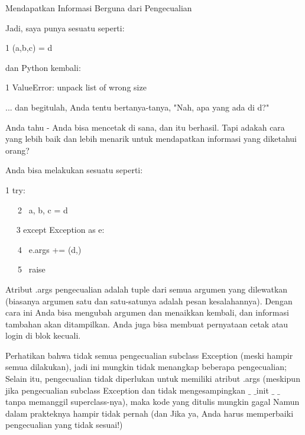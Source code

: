 \vspace{12pt}
Mendapatkan Informasi Berguna dari Pengecualian \par
\vspace{12pt}
Jadi, saya punya sesuatu seperti: \par
\vspace{12pt}
1 (a,b,c) = d \par
\vspace{12pt}
dan Python kembali: \par
\vspace{12pt}
1 ValueError: unpack list of wrong size \par
\vspace{12pt}
... dan begitulah, Anda tentu bertanya-tanya, "Nah, apa yang ada di d?" \par
\vspace{12pt}
Anda tahu - Anda bisa mencetak di sana, dan itu berhasil. Tapi adakah cara yang lebih baik dan lebih menarik untuk mendapatkan informasi yang diketahui orang? \par
\vspace{12pt}
Anda bisa melakukan sesuatu seperti: \par
\vspace{12pt}
1 try: \par
~~~2~  a, b, c = d \par
~~ 3 except Exception as e: \par
~~~4~  e.args += (d,) \par
~~~5~  raise \par
\vspace{12pt}
Atribut .args pengecualian adalah tuple dari semua argumen yang dilewatkan (biasanya argumen satu dan satu-satunya adalah pesan kesalahannya). Dengan cara ini Anda bisa mengubah argumen dan menaikkan kembali, dan informasi tambahan akan ditampilkan. Anda juga bisa membuat pernyataan cetak atau login di blok kecuali. \par
\vspace{12pt}
Perhatikan bahwa tidak semua pengecualian subclass Exception (meski hampir semua dilakukan), jadi ini mungkin tidak menangkap beberapa pengecualian; Selain itu, pengecualian tidak diperlukan untuk memiliki atribut .args (meskipun jika pengecualian subclass Exception dan tidak mengesampingkan  $  \_  $ $  \_  $init $  \_  $ $  \_  $ tanpa memanggil superclass-nya), maka kode yang ditulis mungkin gagal Namun dalam prakteknya hampir tidak pernah (dan Jika ya, Anda harus memperbaiki pengecualian yang tidak sesuai!) \par
